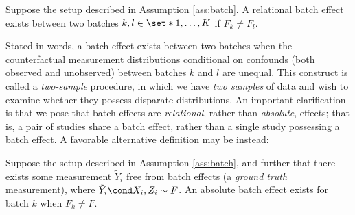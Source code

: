 \begin{definition}
Suppose the setup described in Assumption \ref{ass:batch}. A relational batch effect exists between two batches $k, l \in \set*{1, \hdots, K}$ if $F_k \neq F_l$.
\label{def:batch_effect}
\end{definition}
Stated in words, a batch effect exists between two batches when the counterfactual measurement distributions conditional on confounds (both observed and unobserved) between batches $k$ and $l$ are unequal. This construct is called a \textit{two-sample} procedure, in which we have \textit{two samples} of data and wish to examine whether they possess disparate distributions. An important clarification is that we pose that batch effects are \textit{relational}, rather than \textit{absolute}, effects; that is, a pair of studies share a batch effect, rather than a single study possessing a batch effect. A favorable alternative definition may be instead:
\begin{definition}
Suppose the setup described in Assumption \ref{ass:batch}, and further that there exists some measurement $\tilde Y_i$ free from batch effects (a \textit{ground truth} measurement), where $\tilde Y_i \cond X_i, Z_i \sim F$. An absolute batch effect exists for batch $k$ when $F_k \neq F$.
\label{def:abs_batch_effect}
\end{definition}
